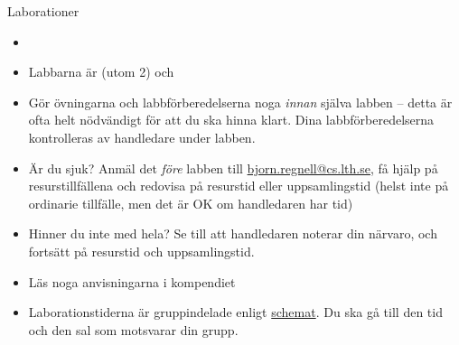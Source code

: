 \documentclass{lecturenotes}
\begin{document}

\begin{Slide}{Laborationer}\footnotesize
\begin{itemize}
\item {}
\item Labbarna är  (utom 2) och 
\item Gör övningarna och labbförberedelserna noga \textit{innan} själva labben -- detta är ofta helt nödvändigt för att du ska hinna klart. Dina labbförberedelserna kontrolleras av handledare under labben.
\item Är du sjuk? Anmäl det \textit{före} labben till \url{bjorn.regnell@cs.lth.se}, få hjälp på resurstillfällena och redovisa på resurstid eller uppsamlingstid (helst inte på ordinarie tillfälle, men det är OK om handledaren har tid)
\item Hinner du inte med hela? Se till att handledaren noterar din närvaro, och fortsätt på resurstid och uppsamlingstid.
\item Läs noga anvisningarna i kompendiet
\item Laborationstiderna är gruppindelade enligt \href{http://cs.lth.se/eda016/schema/}{schemat}. Du ska gå till den tid och den sal som motsvarar din grupp.
\end{itemize}
\end{Slide}
\end{document}
